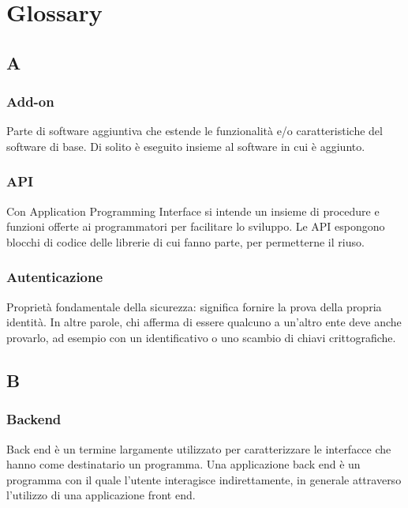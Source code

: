 \section{Glossary}

\subsection*{A}

\subsubsection*{Add-on}
Parte di software aggiuntiva che estende le funzionalità e/o caratteristiche del software di base. Di solito è eseguito insieme al software in cui è aggiunto.

\subsubsection*{API}
Con Application Programming Interface si intende un insieme di procedure e funzioni offerte ai programmatori per facilitare lo sviluppo. Le API espongono blocchi di codice delle librerie di cui fanno parte, per permetterne il riuso.

\subsubsection*{Autenticazione}
Proprietà fondamentale della sicurezza: significa fornire la prova della propria identità. In altre parole, chi afferma di essere qualcuno a un'altro ente deve anche provarlo, ad esempio con un identificativo o uno scambio di chiavi crittografiche.

\subsection*{B}

\subsubsection*{Backend}
Back end è un termine largamente utilizzato per caratterizzare le interfacce che hanno come destinatario un programma. Una applicazione back end è un programma con il quale l'utente interagisce indirettamente, in generale attraverso l'utilizzo di una applicazione front end.

